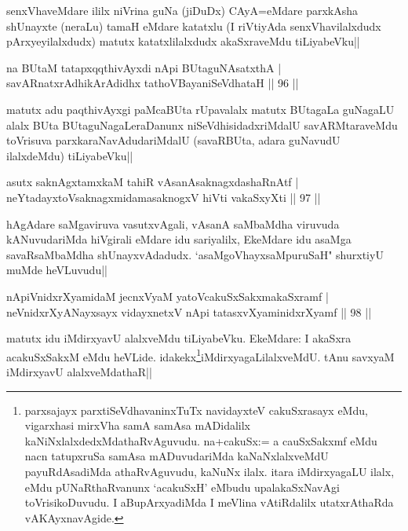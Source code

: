\begin{artha}
senxVhaveMdare ililx niVrina guNa (jiDuDx) CAyA=eMdare parxkAsha shUnayxte (neraLu) tamaH eMdare katatxlu (I riVtiyAda senxVhavilalxdudx pArxyeyilalxdudx) matutx katatxlilalxdudx akaSxraveMdu tiLiyabeVku||
\end{artha}

\begin{shl}
na BUtaM tatapxqqthivAyxdi nApi BUtaguNAsatxthA |\\
savARnatxrAdhikArAdidhx tathoVBayaniSeVdhataH \hfill || 96 ||
\end{shl}

\begin{artha}%
matutx adu paqthivAyxgi paMcaBUta rUpavalalx matutx BUtagaLa guNagaLU alalx BUta BUtaguNagaLeraDanunx niSeVdhisidadxriMdalU savARMtaraveMdu toVrisuva parxkaraNavAdudariMdalU (savaRBUta, adara guNavudU ilalxdeMdu) tiLiyabeVku||
\end{artha}

\begin{shl}
asutx saknAgxtamxkaM tahiR vAsanAsaknagxdashaRnAtf |\\
neYtadayxtoV\s saknagxmidamasaknogxV hiVti vakaSxyXti \hfill || 97 ||
\end{shl}

\begin{artha}
hAgAdare saMgaviruva vasutxvAgali, vAsanA saMbaMdha viruvuda kANuvudariMda hiVgirali eMdare idu sariyalilx, EkeMdare idu asaMga savaRsaMbaMdha shUnayxvAdadudx. `asaMgoVhayxsaMpuruSaH" shurxtiyU muMde heVLuvudu||
\end{artha}

\begin{shl}
nApiVnidxrXyamidaM jecnxVyaM yatoV\s cakuSxSakxmakaSxramf |\\
neVnidxrXyANayxsayx vidayxnetxV nApi tatasxvXyaminidxrXyamf \hfill || 98 ||
\end{shl}

\begin{artha}
matutx idu iMdirxyavU alalxveMdu tiLiyabeVku. EkeMdare: I akaSxra acakuSxSakxM eMdu heVLide. idakekx\footnote[1]{parxsajayx parxtiSeVdhavaninxTuTx navidayxteV cakuSxrasayx eMdu, vigarxhasi mirxVha samA samAsa mADidalilx kaNiNxlalxdedxMdathaRvAguvudu. na+cakuSx:= a cauSxSakxmf eMdu nacn tatupxruSa samAsa mADuvudariMda kaNaNxlalxveMdU payuRdAsadiMda athaRvAguvudu, kaNuNx ilalx. itara iMdirxyagaLU ilalx, eMdu pUNaRthaRvanunx `acakuSxH' eMbudu upalakaSxNavAgi toVrisikoDuvudu. I aBupArxyadiMda I meVlina vAtiRdalilx utatxrAthaRda vAKAyxnavAgide.}iMdirxyagaLilalxveMdU. tAnu savxyaM iMdirxyavU alalxveMdathaR||
\end{artha}

